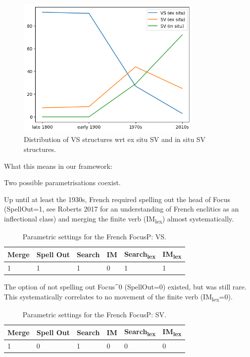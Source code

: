\documentclass[fleqn,10pt]{wlscirep}
\begin{document}
  \begin{figure}[H]
    \centering
    \includegraphics[width=90mm]{images/exsituinsitu.png}
    \caption{Distribution of VS structures wrt ex situ SV and in situ SV structures.}
    \label{fig:boat2}
  \end{figure}

  \noindent What this means in our framework:

  \noindent Two possible parametrisations coexist.
  
  \noindent Up until at least the 1930s, French required spelling out the head of Focus (SpellOut=1, see Roberts 2017 for an understanding of French enclitics as an inflectional class) and merging the finite verb (IM\textsubscript{lex}) almost systematically.

    \begin{table}[H]
        \centering
        \begin{tabular}{|l|l|l|l|l|l|}
        \hline
        Merge & Spell Out & Search & IM & Search\textsubscript{lex} & IM\textsubscript{lex} \\
        \hline
        1 & 1 & 1 & 0 & 1 & 1 \\
        \hline
        \end{tabular}
        \caption{\label{tab:samp}Parametric settings for the French FocusP: VS.}
    \end{table}

\noindent The option of not spelling out Focus^0 (SpellOut=0) existed, but was still rare. This systematically correlates to no movement of the finite verb (IM\textsubscript{lex}=0).

\begin{table}[H]
    \centering
    \begin{tabular}{|l|l|l|l|l|l|}
    \hline
    Merge & Spell Out & Search & IM & Search\textsubscript{lex} & IM\textsubscript{lex} \\
    \hline
    1 & 0 & 1 & 0 & 0 & 0 \\
    \hline
    \end{tabular}
    \caption{\label{tab:samp}Parametric settings for the French FocusP: SV.}
\end{table}
\end{document}
